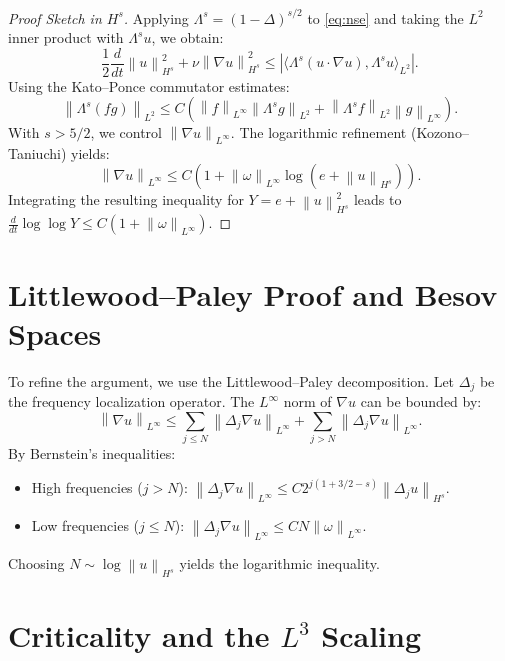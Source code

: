 \documentclass[11pt,a4paper]{amsart}
\newcommand{\norm}[1]{\left\|#1\right\|}
\newcommand{\abs}[1]{\left|#1\right|}
\newcommand{\inner}[2]{\langle #1, #2 \rangle}
\begin{document}
\begin{proof}[Proof Sketch in $H^s$]
Applying $\Lambda^s = (1-\Delta)^{s/2}$ to \eqref{eq:nse} and taking the $L^2$ inner product with $\Lambda^s u$, we obtain:
\begin{equation}
\frac{1}{2} \frac{d}{dt} \norm{u}_{H^s}^2 + \nu \norm{\nabla u}_{H^s}^2 \le \abs{\inner{\Lambda^s(u \cdot \nabla u)}{\Lambda^s u}_{L^2}}.
\end{equation}
Using the Kato--Ponce commutator estimates:
\begin{equation}
\norm{\Lambda^s(fg)}_{L^2} \le C (\norm{f}_{L^\infty} \norm{\Lambda^s g}_{L^2} + \norm{\Lambda^s f}_{L^2} \norm{g}_{L^\infty}).
\end{equation}
With $s > 5/2$, we control $\norm{\nabla u}_{L^\infty}$. The logarithmic refinement (Kozono--Taniuchi) yields:
\begin{equation}
\norm{\nabla u}_{L^\infty} \le C (1 + \norm{\omega}_{L^\infty} \log(e + \norm{u}_{H^s})).
\end{equation}
Integrating the resulting inequality for $Y = e + \norm{u}_{H^s}^2$ leads to $\frac{d}{dt} \log \log Y \le C(1 + \norm{\omega}_{L^\infty})$.
\end{proof}

\section{Littlewood--Paley Proof and Besov Spaces}

To refine the argument, we use the Littlewood--Paley decomposition. Let $\Delta_j$ be the frequency localization operator.
The $L^\infty$ norm of $\nabla u$ can be bounded by:
\begin{equation}
\norm{\nabla u}_{L^\infty} \le \sum_{j \le N} \norm{\Delta_j \nabla u}_{L^\infty} + \sum_{j > N} \norm{\Delta_j \nabla u}_{L^\infty}.
\end{equation}
By Bernstein's inequalities:
\begin{itemize}
    \item High frequencies ($j > N$): $\norm{\Delta_j \nabla u}_{L^\infty} \le C 2^{j(1 + 3/2 - s)} \norm{\Delta_j u}_{H^s}$.
    \item Low frequencies ($j \le N$): $\norm{\Delta_j \nabla u}_{L^\infty} \le C N \norm{\omega}_{L^\infty}$.
\end{itemize}
Choosing $N \sim \log \norm{u}_{H^s}$ yields the logarithmic inequality.

\section{Criticality and the $L^3$ Scaling}
\end{document}
